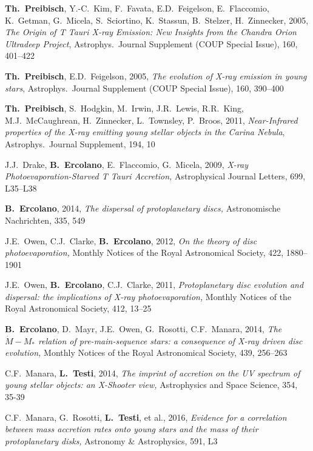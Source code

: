 \documentclass[10pt,fleqn,twoside]{article}
\begin{document}
\begin{literature}
\item
\textbf{Th.~Preibisch}, Y.-C.~Kim, F.~Favata, E.D.~Feigelson, E.~Flaccomio,
K.~Getman, G.~Micela, S.~Sciortino, K.~Stassun, B.~Stelzer, H.~Zinnecker,
2005,
{\em The Origin of T Tauri X-ray Emission: New Insights from
the Chandra Orion Ultradeep Project}, Astrophys.~Journal Supplement
(COUP Special Issue), 160, 401--422
\item
\textbf{Th.~Preibisch}, E.D.~Feigelson, 2005,
{\em The evolution of X-ray emission in young stars},
Astrophys.~Journal Supplement (COUP Special Issue), 160, 390--400
\item
\textbf{Th.~Preibisch}, S.~Hodgkin, M.~Irwin, J.R.~Lewis, R.R.~King, M.J.~McCaughrean, H.~Zinnecker, L.~Townsley,
P.~Broos, 2011,
{\em Near-Infrared properties of the X-ray emitting young stellar objects in the
Carina Nebula}, Astrophys.~Journal Supplement, 194, 10
\item
J.J.~Drake,  \textbf{B.~Ercolano}, E.~Flaccomio, G.~Micela, 2009,
{\em X-ray Photoevaporation-Starved T Tauri Accretion,}
Astrophysical Journal Letters, 699,  L35--L38 
\item
\textbf{B.~Ercolano}, 2014,
{\em The dispersal of protoplanetary discs,}
	Astronomische Nachrichten, 335, 549
\item
J.E.~Owen, C.J.~Clarke, \textbf{B.~Ercolano}, 2012,
{\em On the theory of disc photoevaporation,}
Monthly Notices of the Royal Astronomical Society, 422, 1880--1901
\item
J.E.~Owen, \textbf{B.~Ercolano}, C.J.~Clarke, 2011,
{\em Protoplanetary disc evolution and dispersal: the implications of X-ray photoevaporation,}
Monthly Notices of the Royal Astronomical Society, 412, 13--25 
\item
\textbf{B.~Ercolano}, D.~Mayr, J.E.~Owen, G.~Rosotti, C.F.~Manara, 2014,
{\em The $\dot{M}-M_*$ relation of pre-main-sequence stars: a consequence of X-ray driven disc evolution,}
Monthly Notices of the Royal Astronomical Society, 439, 256--263 
\item
C.F.~Manara, \textbf{L.~Testi}, 2014,
{\em The imprint of accretion on the UV spectrum of young stellar objects: an X-Shooter view,}
Astrophysics and Space Science, 354, 35-39  
\item
C.F.~Manara, G.~Rosotti, \textbf{L.~Testi}, et al., 2016,
{\em Evidence for a correlation between mass accretion rates onto young stars and the mass of their protoplanetary disks,}
Astronomy \& Astrophysics, 591, L3
\end{literature}
\end{document}
